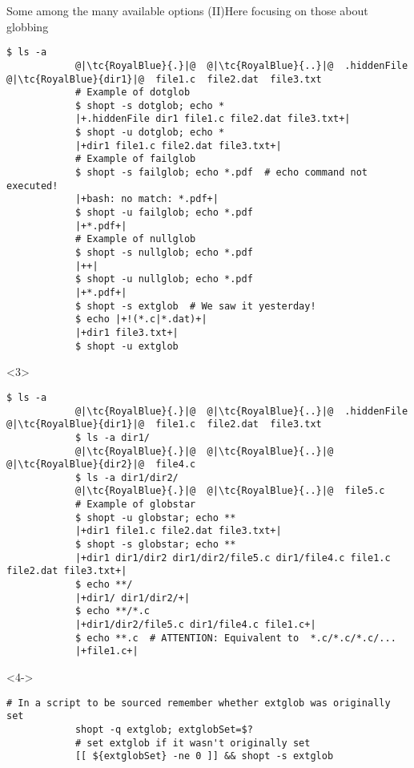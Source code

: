 \begin{frame}[fragile]{Some among the many available options (II)}{Here focusing on those about globbing}
\begin{onlyenv}
\begin{lstlisting}[style=myBash, style=smaller]
            $ ls -a
            @|\tc{RoyalBlue}{.}|@  @|\tc{RoyalBlue}{..}|@  .hiddenFile  @|\tc{RoyalBlue}{dir1}|@  file1.c  file2.dat  file3.txt
            # Example of dotglob
            $ shopt -s dotglob; echo *
            |+.hiddenFile dir1 file1.c file2.dat file3.txt+|
            $ shopt -u dotglob; echo *
            |+dir1 file1.c file2.dat file3.txt+|
            # Example of failglob
            $ shopt -s failglob; echo *.pdf  # echo command not executed!
            |+bash: no match: *.pdf+|
            $ shopt -u failglob; echo *.pdf
            |+*.pdf+|
            # Example of nullglob
            $ shopt -s nullglob; echo *.pdf
            |++|
            $ shopt -u nullglob; echo *.pdf
            |+*.pdf+|
            $ shopt -s extglob  # We saw it yesterday!
            $ echo |+!(*.c|*.dat)+|
            |+dir1 file3.txt+|
            $ shopt -u extglob
        \end{lstlisting}
    \end{onlyenv}
    \begin{onlyenv}<3>
        \begin{lstlisting}[style=myBash, style=smaller, firstnumber=22]
            $ ls -a
            @|\tc{RoyalBlue}{.}|@  @|\tc{RoyalBlue}{..}|@  .hiddenFile  @|\tc{RoyalBlue}{dir1}|@  file1.c  file2.dat  file3.txt
            $ ls -a dir1/
            @|\tc{RoyalBlue}{.}|@  @|\tc{RoyalBlue}{..}|@  @|\tc{RoyalBlue}{dir2}|@  file4.c
            $ ls -a dir1/dir2/
            @|\tc{RoyalBlue}{.}|@  @|\tc{RoyalBlue}{..}|@  file5.c
            # Example of globstar
            $ shopt -u globstar; echo **
            |+dir1 file1.c file2.dat file3.txt+|
            $ shopt -s globstar; echo **
            |+dir1 dir1/dir2 dir1/dir2/file5.c dir1/file4.c file1.c file2.dat file3.txt+|
            $ echo **/
            |+dir1/ dir1/dir2/+|
            $ echo **/*.c
            |+dir1/dir2/file5.c dir1/file4.c file1.c+|
            $ echo **.c  # ATTENTION: Equivalent to  *.c/*.c/*.c/...
            |+file1.c+|
        \end{lstlisting}
    \end{onlyenv}
    \begin{onlyenv}<4->
        \vspace{-2mm}
        \begin{lstlisting}[style=myBash, numbers=none, style=smaller]
            # In a script to be sourced remember whether extglob was originally set
            shopt -q extglob; extglobSet=$?
            # set extglob if it wasn't originally set
            [[ ${extglobSet} -ne 0 ]] && shopt -s extglob

\end{lstlisting}
\end{onlyenv}
\end{frame}
